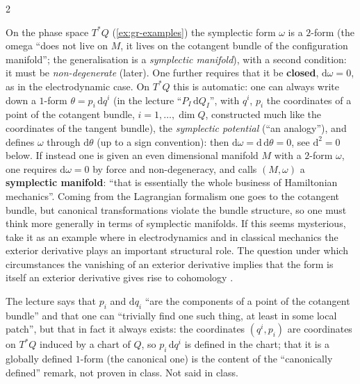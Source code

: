 \begin{paracol}{2}
\begin{example}\label{ex:gr-symplectic}
On the phase space $T^*Q$ (\cref{ex:gr-examples}) the symplectic form $\omega$ is a $2$-form (the omega ``does not live on $M$, it lives on the cotangent bundle of the configuration manifold''; the generalisation is a \emph{symplectic manifold}), with a second condition: it must be \emph{non-degenerate} (later). One further requires that it be \textbf{closed}, $\mathrm d\omega=0$, as in the electrodynamic case.
On $T^*Q$ this is automatic: one can always write down a $1$-form $\theta=p_i\,\mathrm dq^i$ (in the lecture ``$P_I\,\mathrm dQ_I$'', with $q^i$, $p_i$ the coordinates of a point of the cotangent bundle, $i=1,\dots,\dim Q$, constructed much like the coordinates of the tangent bundle), the \emph{symplectic potential} (``an analogy''), and defines $\omega$ through $\mathrm d\theta$ (up to a sign convention): then $\mathrm d\omega=\mathrm d\,\mathrm d\theta=0$,
see $\mathrm d^2=0$ below. If instead one is given an even dimensional manifold $M$ with a $2$-form $\omega$, one requires $\mathrm d\omega=0$ by force and non-degeneracy, and calls $(M,\omega)$ a \textbf{symplectic manifold}: ``that is essentially the whole business of Hamiltonian mechanics''. Coming from the Lagrangian formalism one goes to the cotangent bundle, but canonical transformations violate the bundle structure, so one must think more generally in terms of symplectic
manifolds. If this seems mysterious, take it as an example where in electrodynamics and in classical mechanics the exterior derivative plays an important structural role. The question under which circumstances the vanishing of an exterior derivative implies that the form is itself an exterior derivative gives rise to cohomology            .
\end{example}
\begin{coursenote}
The lecture says that $p_i$ and $\mathrm dq_i$ ``are the components of a point of the cotangent bundle'' and that one can ``trivially find one such thing, at least in some local patch'', but that in fact it always exists: the coordinates $(q^i,p_i)$ are coordinates on $T^*Q$ induced by a chart of $Q$, so $p_i\,\mathrm dq^i$ is defined in the chart; that it is a globally defined $1$-form (the canonical one) is the content of the ``canonically defined'' remark, not proven in class. Not said in class.
 
\end{coursenote}


\end{paracol}
